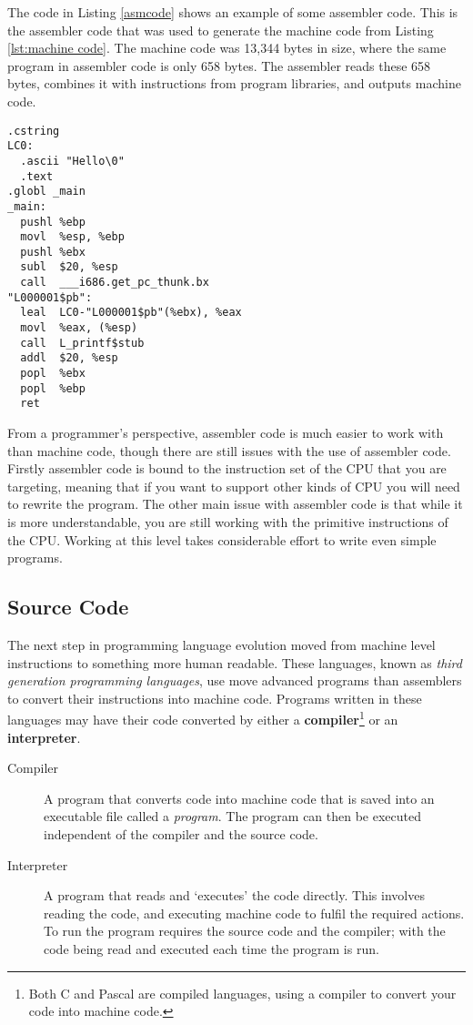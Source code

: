 The code in Listing \vref{asmcode} shows an example of some assembler code. This is the assembler code that was used to generate the machine code from Listing \ref{lst:machine code}. The machine code was 13,344 bytes in size, where the same program in assembler code is only 658 bytes. The assembler reads these 658 bytes, combines it with instructions from program libraries, and outputs machine code. 


\begin{lstlisting}[caption={Assembler Sample},label={asmcode}]
  .cstring
LC0:
  .ascii "Hello\0"
  .text
.globl _main
_main:
  pushl	%ebp
  movl	%esp, %ebp
  pushl	%ebx
  subl	$20, %esp
  call	___i686.get_pc_thunk.bx 
"L000001$pb":
  leal	LC0-"L000001$pb"(%ebx), %eax
  movl	%eax, (%esp)
  call	L_printf$stub
  addl	$20, %esp
  popl	%ebx
  popl	%ebp
  ret
\end{lstlisting}

From a programmer's perspective, assembler code is much easier to work with than machine code, though there are still issues with the use of assembler code. Firstly assembler code is bound to the instruction set of the CPU that you are targeting, meaning that if you want to support other kinds of CPU you will need to rewrite the program. The other main issue with assembler code is that while it is more understandable, you are still working with the primitive instructions of the CPU. Working at this level takes considerable effort to write even simple programs.

\clearpage
\subsection{Source Code} %
\label{sub:source_code}

The next step in programming language evolution moved from machine level instructions to something more human readable. These languages, known as \emph{third generation programming languages}, use move advanced programs than assemblers to convert their instructions into machine code. Programs written in these languages may have their code converted by either a \textbf{compiler}\footnote{Both C and Pascal are compiled languages, using a compiler to convert your code into machine code.} or an \textbf{interpreter}.

\begin{description}
\item[Compiler] A program that converts code into machine code that is saved into an executable file called a \emph{program}. The program can then be executed independent of the compiler and the source code.
\item[Interpreter] A program that reads and `executes' the code directly. This involves reading the code, and executing machine code to fulfil the required actions. To run the program requires the source code and the compiler; with the code being read and executed each time the program is run.
\end{description}

